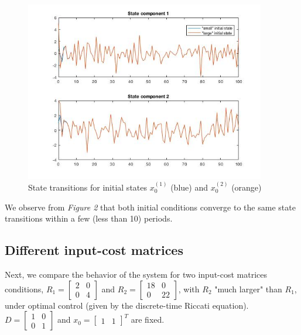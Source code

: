 \documentclass[11pt, oneside]{article}   	%
\begin{document}
\begin{figure}[ht!]
\centering
\includegraphics[width=105mm]{../plots/iii.jpg}
\caption{State transitions for initial states $x_0^{(1)}$ (blue) and $x_0^{(2)}$ (orange)}
\end{figure}

We observe from \textit{Figure 2} that both initial conditions converge to the same state transitions within a few (less than 10) periods.

\subsection{Different input-cost matrices}
Next, we compare the behavior of the system for two input-cost matrices conditions, $R_1 = \begin{bmatrix} 2 & 0 \\[0.3em] 0 & 4 \end{bmatrix}$ and $R_2 = \begin{bmatrix} 18 & 0 \\[0.3em] 0 & 22 \end{bmatrix}$, with $R_2$ "much larger" than $R_1$, under optimal control (given by the discrete-time Riccati equation). $D = \begin{bmatrix} 1 & 0 \\[0.3em] 0 & 1\end{bmatrix}$ and $x_0 = \begin{bmatrix} 1 & 1 \end{bmatrix}^T$ are fixed. \\
\end{document}
